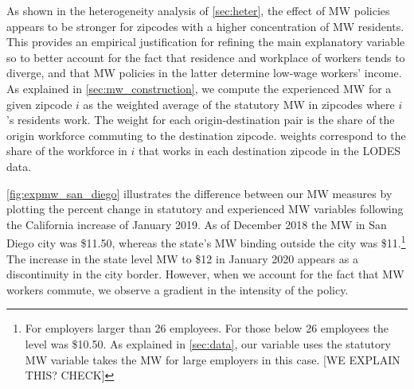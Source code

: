 As shown in the heterogeneity analysis of \autoref{sec:heter}, the effect of MW policies 
appears to be stronger for zipcodes with a higher concentration of MW residents. This 
provides an empirical justification for refining the main explanatory variable so to 
better account for the fact that residence and workplace of workers tends to diverge, 
and that MW policies in the latter determine low-wage workers' income. As explained in 
\autoref{sec:mw_construction}, we compute the experienced MW for a given zipcode $i$ as 
the weighted average of the statutory MW in zipcodes where $i$'s residents  work.
The weight for each origin-destination pair is the share of the origin workforce commuting to
the destination zipcode. weights correspond to the share of the workforce in $i$ that works in 
each destination zipcode in the LODES data.

\autoref{fig:expmw_san_diego} illustrates the difference between our MW measures by plotting 
the percent change in statutory and experienced MW variables following the California 
increase of January 2019. As of December 2018 the MW in San Diego city was \$11.50, 
whereas the state's MW binding outside the city was \$11.\footnote{For employers larger 
	than 26 employees. For those below 26 employees the level was \$10.50. As explained in 
	\autoref{sec:data}, our variable uses the statutory MW variable takes the MW for
	large employers in this case. [WE EXPLAIN THIS? CHECK]}
The increase in the state level MW to \$12 in January 2020 appears as a discontinuity in the 
city border. However, when we account for the fact that MW workers commute, we observe a 
gradient in the intensity of the policy.

